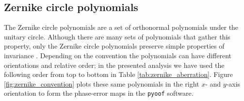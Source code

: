 \documentclass[
    ]
    {aa}
\begin{document}
    \begin{appendix}
        \section{Zernike circle polynomials}
        \label{ap:zernike_circle_polynomials}
        The Zernike circle polynomials are a set of orthonormal polynomials under the unitary circle. Although there are many sets of polynomials that gather this property, only the Zernike circle polynomials preserve simple properties of invariance \citep[see][Chapter~9.2]{1965poet.book.....B}.
        Depending on the convention the polynomials can have different orientations and relative order; in the presented analysis we have used the following order from top to bottom in Table \ref{tab:zernike_aberration}. Figure \ref{fig:zernike_convention} plots these same polynomials in the right $x$- and $y$-axis orientation to form the phase-error maps in the \texttt{pyoof} software.


\end{appendix}
\end{document}
